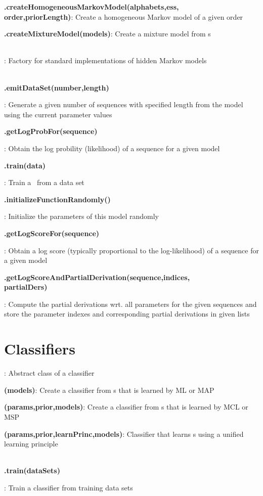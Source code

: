 \documentclass[10pt]{scrartcl}
\newcommand{\entry}[3]{{\item[]\bfseries #1#2}: #3}
\newcommand{\entrys}[3]{\item[\emph{static}] {\bfseries {#1#2}}: #3}
\newcommand{\entryn}[3]{\item[new] {\bfseries {#1#2}}: #3}
\newcommand{\sep}{\\~\vspace{-0.1cm}}
\begin{document}
\begin{flushleft}
\begin{itemize*}
\entrys{\DiffSMFactory}{.createHomogeneousMarkovModel(alphabets,ess,\\order,priorLength)}{Create a homogeneous Markov model of a given order}

\entrys{\DiffSMFactory}{.createMixtureModel(models)}{Create a mixture model from \DiffSM s}\sep

\entry{\HMMFactory}{}{Factory for standard implementations of hidden Markov models}\sep

\entry{\StatMod}{.emitDataSet(number,length)}{Generate a given number of sequences with specified length from the model using the current parameter values}

\entry{\StatMod}{.getLogProbFor(sequence)}{Obtain the log probility (likelihood) of a sequence for a given model}

\entry{\TrainSM}{.train(data)}{Train a \TrainSM~from a data set}

\entry{\DiffSM}{.initializeFunctionRandomly()}{Initialize the parameters of this model randomly}

\entry{\DiffSM}{.getLogScoreFor(sequence)}{Obtain a log score (typically proportional to the log-likelihood) of a sequence for a given model}

\entry{\DiffSM}{.getLogScoreAndPartialDerivation(sequence,indices,\\partialDers)}{Compute the partial derivations wrt. all parameters for the given sequences and store the parameter indexes and corresponding partial derivations in given lists}

\end{itemize*}

\section{Classifiers}

\begin{itemize*}

\entry{\AbstractClassifier}{}{Abstract class of a classifier}

\entryn{\TrainSMBasedClassifier}{(models)}{Create a classifier from \TrainSM s that is learned by ML or MAP}

\entryn{\MSPClassifier}{(params,prior,models)}{Create a classifier from \DiffSM s that is learned by MCL or MSP}

\entryn{\GenDisMixClassifier}{(params,prior,learnPrinc,models)}{Classifier that learns \DiffSM s using a unified learning principle}\sep

\entry{\AbstractClassifier}{.train(dataSets)}{Train a classifier from training data sets}


\end{itemize*}
\end{flushleft}
\end{document}
